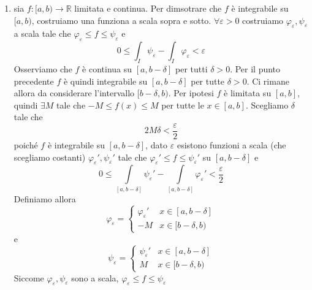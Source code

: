 \documentclass[a4paper]{article}
\begin{document}
{\begin{enumerate}
\begin{enumerate}
\[\begin{cases}
                \end{cases}
            \]
            \(\overline{f}\) è monotona su \([a,b]\)
            e quindi ivi integrabile e quindi \(\overline{f} = f\) è integrabile
            nel sottoinsieme \([a,b)\).
            \item sia \(f\colon [a,b) \to \mathbb{R}\) limitata e continua.
            Per dimsotrare che \(f\) è integrabile su \([a,b)\),
            costruiamo una funziona a scala sopra e sotto. \(\forall \varepsilon > 0\)
            costruiamo \(\varphi_\varepsilon, \psi_\varepsilon\) a scala tale che \(\varphi_\varepsilon \leq f \leq \psi_\varepsilon\)
            e
            \[
                0 \leq \int_I \psi_\varepsilon - \int_I \varphi_\varepsilon < \varepsilon
            \]
            Osserviamo che \(f\) è continua su \([a,b-\delta]\) per tutti \(\delta > 0\).
            Per il punto precedente \(f\) è quindi integrabile su
            \([a,b-\delta]\) per tutte \(\delta>0\).
            Ci rimane allora da considerare l'intervallo \([b-\delta, b)\).
            Per ipotesi \(f\) è limitata su \([a,b]\), quindi \(\exists M\)
            tale che \(-M \leq f(x) \leq M\) per tutte le \(x\in [a,b]\).
            Scegliamo \(\delta\) tale che
            \[
                2M\delta < \frac{\varepsilon}{2}
            \]
            poiché \(f\) è integrabile su \([a,b-\delta]\), dato \(\varepsilon\) esistono
            funzioni a scala (che scegliamo costanti)
            \(\varphi_\varepsilon', \psi_\varepsilon'\) tale che \(\varphi_\varepsilon' \leq f \leq \psi_\varepsilon'\)
            su \([a,b-\delta]\) e
            \[
                0 \leq \int\limits_{[a,b-\delta]} \psi_\varepsilon' - \int\limits_{[a,b-\delta]} \varphi_\varepsilon' < \frac{\varepsilon}{2}
            \]
            Definiamo allora
            \[
                \varphi_\varepsilon = \begin{cases}
                    \varphi_\varepsilon' & x\in[a,b-\delta] \\
                    -M & x\in [b-\delta, b)
                \end{cases}
            \]
            e
            \[
                \psi_\varepsilon = \begin{cases}
                    \psi_\varepsilon' & x\in[a,b-\delta] \\
                    M & x\in [b-\delta, b)
                \end{cases}
            \]
            Siccome \(\varphi_\varepsilon, \psi_\varepsilon\) sono a scala, \(\varphi_\varepsilon \leq f \leq \psi_\varepsilon\)

\end{enumerate}
\end{enumerate}}
\end{document}
